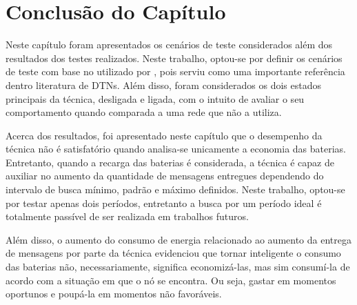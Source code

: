 \section{Conclusão do Capítulo}

Neste capítulo foram apresentados os cenários de teste considerados além dos resultados dos testes realizados. Neste trabalho, optou-se por definir os cenários de teste com base no utilizado por \cite{denis_artigo}, pois serviu como uma importante referência dentro literatura de DTNs. Além disso, foram considerados os dois estados principais da técnica, desligada e ligada, com o intuito de avaliar o seu comportamento quando comparada a uma rede que não a utiliza.

Acerca dos resultados, foi apresentado neste capítulo que o desempenho da técnica não é satisfatório quando analisa-se unicamente a economia das baterias. Entretanto, quando a recarga das baterias é considerada, a técnica é capaz de auxiliar no aumento da quantidade de mensagens entregues dependendo do intervalo de busca mínimo, padrão e máximo definidos. Neste trabalho, optou-se por testar apenas dois períodos, 
entretanto a busca por um período ideal é totalmente passível de ser realizada em trabalhos futuros.

Além disso, o aumento do consumo de energia relacionado ao aumento da entrega de mensagens por parte da técnica evidenciou que tornar inteligente o consumo das baterias não, necessariamente, significa economizá-las, mas sim consumí-la de acordo com a situação em que o nó se encontra. Ou seja, gastar em momentos oportunos e poupá-la em momentos não favoráveis.

